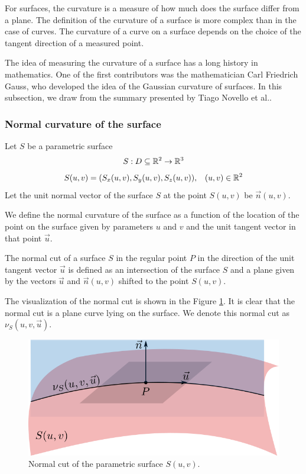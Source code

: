 For surfaces, the curvature is a measure of how much does the surface differ from a 
plane. The definition of the curvature of a surface is more complex than in the case of curves. The curvature of a curve on a surface depends on the 
choice of the tangent direction of a measured point.

The idea of measuring the curvature of a surface has a long history in mathematics.
One of the first contributors was the mathematician Carl Friedrich Gauss, who developed
the idea of the Gaussian curvature of surfaces. In this subsection, we draw from
the summary presented by Tiago Novello et al.\cite{novello2021differential}.

\subsubsection*{Normal curvature of the surface}

Let $S$ be a parametric surface $$S: D \subseteq \mathbb{R}^2 \to \mathbb{R}^3$$ 
$$S(u, v) = (S_x(u,v), S_y(u,v), S_z(u,v)), \hspace{3mm} (u,v)\in \mathbb{R}^2$$
Let the unit normal vector of the surface $S$ at the point $S(u, v)$ be $\vec{n}(u, v)$.

We define the normal curvature of the surface as a function of the location of the point
on the surface given by parameters $u$ and $v$ and the unit tangent vector in that point $\vec{u}$. 

\begin{definition}
The normal cut of a surface $S$ in the regular point $P$ in the direction of the unit tangent vector 
$\vec{u}$ is defined as an intersection of the surface $S$ and a plane
given by the vectors $\vec{u}$ and $\vec{n}(u, v)$ shifted to 
the point $S(u, v)$. 
\end{definition}

The visualization of the normal cut is shown in the Figure \ref{img:14}.
It is clear that the
normal cut is a plane curve lying on the surface. We denote this normal cut as $\nu_S(u, v, \vec{u})$.

\begin{figure}
    \centerline{\includegraphics[scale=0.5]{images/img14}}
    \caption[Normal cut]
    {Normal cut of the parametric surface $S(u,v)$.}
    \label{img:14}
\end{figure}

